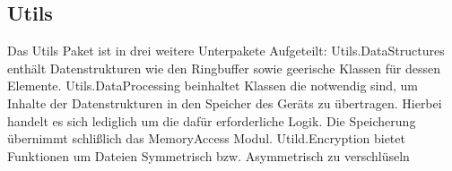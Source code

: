 \label{app:module:utils}\subsection{Utils}
Das Utils Paket ist in drei weitere Unterpakete Aufgeteilt: Utils.DataStructures enthält Datenstrukturen wie den Ringbuffer sowie geerische Klassen für dessen  Elemente. Utils.DataProcessing beinhaltet Klassen die notwendig sind, um Inhalte der Datenstrukturen in den Speicher des Geräts zu übertragen. Hierbei handelt es sich lediglich um die dafür erforderliche Logik. Die Speicherung übernimmt schlißlich das MemoryAccess Modul. Utild.Encryption bietet Funktionen um Dateien Symmetrisch bzw. Asymmetrisch zu verschlüseln